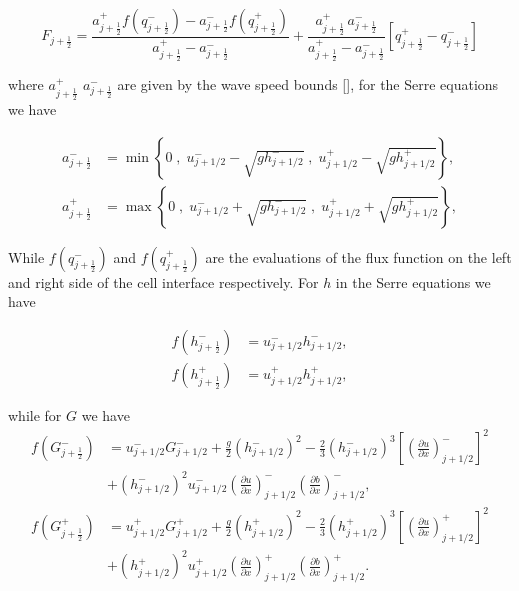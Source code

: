 \begin{equation}\label{eqn:HLL_flux}
F_{j+\frac{1}{2}} = \dfrac{a^+_{j+\frac{1}{2}} f\left(q^-_{j+\frac{1}{2}}\right) - a^-_{j+\frac{1}{2}} f\left(q^+_{j+\frac{1}{2}}\right)}{a^+_{j+\frac{1}{2}} - a^-_{j+\frac{1}{2}}}  + \dfrac{a^+_{j+\frac{1}{2}} \, a^-_{j+\frac{1}{2}}}{a^+_{j+\frac{1}{2}} - a^-_{j+\frac{1}{2}}} \left [ q^+_{j+\frac{1}{2}} - q^-_{j+\frac{1}{2}} \right ]
\end{equation}

where $a^+_{j+\frac{1}{2}}$ $a^-_{j+\frac{1}{2}}$ are given by the wave speed bounds [], for the Serre equations we have

\begin{align*}
a^-_{j+\frac{1}{2}} &= \min\left\lbrace 0\;,\;  u^-_{j + 1/2} - \sqrt{g h^-_{j + 1/2}}  \;,\;u^+_{j + 1/2} - \sqrt{g h^+_{j + 1/2}} \right\rbrace  ,\\
a^+_{j+\frac{1}{2}} &= \max\left\lbrace 0 \;,\;  u^-_{j + 1/2} + \sqrt{g h^-_{j + 1/2}}  \;,\;u^+_{j + 1/2} + \sqrt{g h^+_{j + 1/2}} \right\rbrace  ,
\end{align*}

While $f(q^-_{j+\frac{1}{2}})$ and $f(q^+_{j+\frac{1}{2}})$ are the evaluations of the flux function on the left and right side of the cell interface respectively. For $h$ in the Serre equations we have

\begin{align*}
f\left(h^-_{j+\frac{1}{2}}\right) &= u^-_{j + 1/2}  h^-_{j + 1/2}   ,\\
f\left(h^+_{j+\frac{1}{2}}\right) &= u^+_{j + 1/2}  h^+_{j + 1/2}  ,
\end{align*}

while for $G$ we have 
\begin{align*}
f\left(G^-_{j+\frac{1}{2}}\right) &=  u^-_{j + 1/2} G^-_{j + 1/2}  + \frac{g}{2}\left(h^-_{j + 1/2} \right)^2 - \frac{2}{3}\left(h^-_{j + 1/2}\right)^3 \left[\left(\frac{\partial {u}}{\partial x} \right)^-_{j + 1/2} \right]^2 \\ &+ \left(h^-_{j + 1/2}\right)^2 u^-_{j + 1/2} \left(\frac{\partial {u}}{\partial x} \right)^-_{j + 1/2} \left(\frac{\partial b}{\partial x} \right)^-_{j + 1/2}  ,\\
f\left(G^+_{j+\frac{1}{2}}\right) &= u^+_{j + 1/2} G^+_{j + 1/2}  + \frac{g}{2}\left(h^+_{j + 1/2} \right)^2 - \frac{2}{3}\left(h^+_{j + 1/2}\right)^3 \left[\left(\frac{\partial {u}}{\partial x} \right)^+_{j + 1/2} \right]^2 \\ &+ \left(h^+_{j + 1/2}\right)^2 u^+_{j + 1/2} \left(\frac{\partial {u}}{\partial x} \right)^+_{j + 1/2} \left(\frac{\partial b}{\partial x} \right)^+_{j + 1/2}.
\end{align*}

